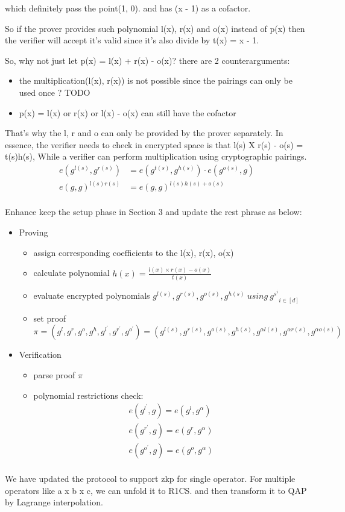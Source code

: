 \documentclass[a4paper,11pt]{article}
\begin{document}
which definitely pass the point(1, 0).  and has (x - 1) as a cofactor.

So if the prover provides such polynomial l(x), r(x) and o(x) instead of p(x) then the verifier will accept it's valid since it's also divide by t(x) = x - 1.

So, why not just let p(x) = l(x) + r(x) - o(x)? there are 2 counterarguments:
\begin{itemize}
\item the multiplication(l(x), r(x)) is not possible since the pairings can only be used once ? TODO
\item p(x) = l(x) or r(x)  or l(x) - o(x) can still have the cofactor
\end{itemize}

That's why the l, r and o can only be provided by the prover separately.  
In essence, the verifier needs to check in encrypted space is that l(s) X r(s) - o(s) = t(s)h(s), While a verifier can perform multiplication using cryptographic pairings. 
\begin{equation}
\begin{split}
e(g^{l(s)}, g^{r(s)})  &= e(g^{t(s)}, g^{h(s)}) \cdot e(g^{o(s)}, g) \\
e(g, g)^{l(s)r(s)} &= e(g, g)^{l(s)h(s) + o(s)}  \\
\end{split}
\end{equation}

Enhance keep the setup phase in Section 3 and update the rest phrase as below:
\begin{itemize}
\item Proving
\begin{itemize}
\item assign corresponding coefficients to the l(x), r(x), o(x) 
\item calculate polynomial $h(x) = \frac{l(x) \times r(x) - o(x)}{t(x)}$
\item evaluate encrypted polynomials $g^{l(s)}, g^{r(s)}, g^{o(s)}, g^{h(s)}\ using\ {g^{s^i}}_{i \in [d]}$
\item set proof $\pi = (g^l,g^r,g^o,g^h,g^{l^{'}},g^{r^{'}}, g^{o^{'}}) = (g^{l(s)},g^{r(s)},g^{o(s)},g^{h(s)},g^{\alpha l(s)},g^{\alpha r(s)}, g^{\alpha o(s)})$ 
\end{itemize}

\item Verification
\begin {itemize}
\item parse proof $\pi$
\item polynomial restrictions check:
\begin{displaymath}
\begin{split}
e(g^{l^{'}}, g) = e(g^l, g^{\alpha})  \\
e(g^{r^{'}}, g) = e(g^r, g^{\alpha}) \\
e(g^{o^{'}}, g) = e(g^o, g^{\alpha}) \\
\end{split}
\end{displaymath}
\end{itemize}
\end{itemize}

We have updated the protocol to support zkp for single operator. 
For multiple operators like a x b x c,  we can unfold it to R1CS.   and then transform it to QAP by Lagrange interpolation.
 
 
 



\end{document}
